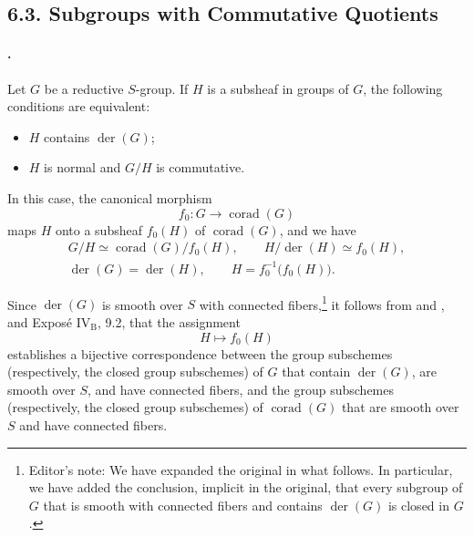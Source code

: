 \subsection*{6.3. Subgroups with Commutative Quotients}

\paragraph{.}
Let \(G\) be a reductive \(S\)-group. If \(H\) is a subsheaf in
groups of \(G\), the following conditions are equivalent:
\begin{itemize}
\item \(H\) contains \(\operatorname{der}(G)\);
\item \(H\) is normal and \(G/H\) is commutative.
\end{itemize}
In this case, the canonical morphism
\[
  f_0:G\longrightarrow\operatorname{corad}(G)
\]
maps \(H\) onto a subsheaf \(f_0(H)\) of
\(\operatorname{corad}(G)\), and we have
\[
\begin{gathered}
  G/H\simeq\operatorname{corad}(G)/f_0(H),
  \qquad
  H/\operatorname{der}(H)\simeq f_0(H),\\
  \operatorname{der}(G)=\operatorname{der}(H),
  \qquad
  H=f_0^{-1}\bigl(f_0(H)\bigr).
\end{gathered}
\]

Since \(\operatorname{der}(G)\) is smooth over \(S\) with
connected fibers,\setcounter{footnote}{63}\footnote{Editor's note:
We have expanded the original in what follows. In particular, we
have added the conclusion, implicit in the original, that every
subgroup of \(G\) that is smooth with connected fibers and contains
\(\operatorname{der}(G)\) is closed in \(G\).} it follows from
 and , and Exposé \(\mathrm{IV_B}\), 9.2,
that the assignment
\[
  H\longmapsto f_0(H)
\]
establishes a bijective correspondence between the group
subschemes \textup{(respectively, the closed group subschemes)} of
\(G\) that contain \(\operatorname{der}(G)\), are smooth over
\(S\), and have connected fibers, and the group subschemes
\textup{(respectively, the closed group subschemes)} of
\(\operatorname{corad}(G)\) that are smooth over \(S\) and have
connected fibers.

